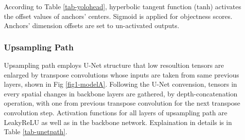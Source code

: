 \documentclass[default,pdflatex,iicol]{sn-jnl}%
\begin{document}
According to Table \ref{tab-yolohead}, hyperbolic tangent function ($\mathrm{tanh}$) activates the offset values of anchors' centers. Sigmoid is applied for objectness scores. Anchors' dimension offsets are set to un-activated outputs.

\begin{table}[]
\centering
\caption{Structure of a YOLO detection branch with the three prior boxes or anchors, where $n$ represents the number of filters, and activation function is denoted by $f(x)$. $w$ and $d$ orderly represents input tensor's spatial size and its depth, which may come from ``res4" or ``res5".}
\label{tab-yolohead}
\end{table}

\subsubsection{Upsampling Path}
Upsampling path employs U-Net structure that low resoultion tensors are enlarged by transpose convolutions whose inputs are taken from same previous layers, shown in Fig \ref{fig1-modelA}. Following the U-Net convension, tensors in every spatial changes in backbone layers are gathered, by depth-concatenation operation, with one from previous transpose convolution for the next transpose convolution step. Activation functions for all layers of upsampling path are LeakyReLU as well as in the backbone network. Explaination in details is in Table \ref{tab-unetpath}.
\end{document}
